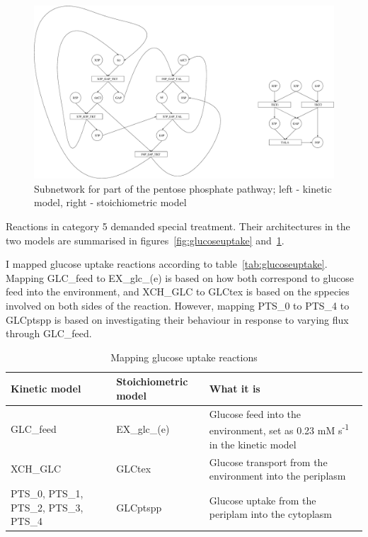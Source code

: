 \documentclass[parskip=full, numbers=noenddot]{scrreprt}
\begin{document}
\begin{figure}[p]
  \centering
  \includegraphics[scale=0.25]{ppp}
  \caption{Subnetwork for part of the pentose phosphate pathway; left - kinetic model, right - stoichiometric model}
  \label{fig:ppp}
\end{figure}

Reactions in category 5 demanded special treatment. Their architectures in the two models are summarised in figures~\ref{fig:glucoseuptake} and~\ref{fig:ppp}.

I mapped glucose uptake reactions according to table~\vref{tab:glucoseuptake}. Mapping GLC\_feed to EX\_glc\_(e) is based on how both correspond to glucose feed into the environment, and XCH\_GLC to GLCtex is based on the sppecies involved on both sides of the reaction. However, mapping PTS\_0 to PTS\_4 to GLCptspp is based on investigating their behaviour in response to varying flux through GLC\_feed.

\begin{table}[hbp]
  \caption{Mapping glucose uptake reactions}
  \label{tab:glucoseuptake}
  \centering
  \begin{tabularx}{\linewidth}{LLL}
    \toprule
    Kinetic model & Stoichiometric model & What it is\\
    \midrule
    GLC\_feed & EX\_glc\_(e) & Glucose feed into the environment, set as 0.23 mM s\textsuperscript{-1} in the kinetic model\\
    XCH\_GLC & GLCtex & Glucose transport from the environment into the periplasm\\
    PTS\_0, PTS\_1, PTS\_2, PTS\_3, PTS\_4 & GLCptspp & Glucose uptake from the periplam into the cytoplasm\\
    \bottomrule
  \end{tabularx}
\end{table}
\end{document}
